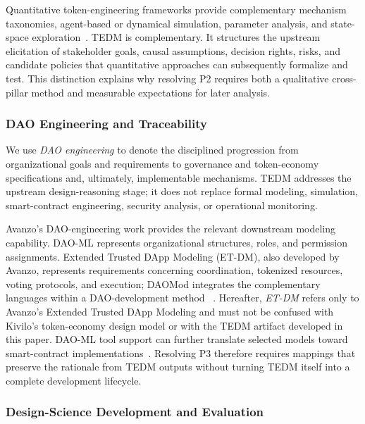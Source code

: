 \documentclass[referee,sn-basic]{sn-jnl}
\begin{document}
Quantitative token-engineering frameworks provide complementary mechanism taxonomies,
agent-based or dynamical simulation, parameter analysis, and state-space
exploration~\cite{liang2023cadcad,Sadykhov2025DeTEcT,
RiceZargham2019TokenEngineeringIII,Zargham2018StateSpaceBlockchain,
Zargham2020}. TEDM is complementary. It structures the upstream elicitation of
stakeholder goals, causal assumptions, decision rights, risks, and candidate
policies that quantitative approaches can subsequently formalize and test.
This distinction explains why resolving P2 requires both a qualitative
cross-pillar method and measurable expectations for later analysis.

\subsubsection{DAO Engineering and Traceability}\label{subsec:dao-engineering}

We use \emph{DAO engineering} to denote the disciplined progression from
organizational goals and requirements to governance and token-economy
specifications and, ultimately, implementable mechanisms. TEDM addresses the
upstream design-reasoning stage; it does not replace formal modeling,
simulation, smart-contract engineering, security analysis, or operational
monitoring.

Avanzo's DAO-engineering work provides the relevant downstream modeling
capability. DAO-ML represents organizational structures, roles, and permission
assignments. Extended Trusted DApp Modeling (ET-DM), also developed by Avanzo,
represents requirements concerning coordination, tokenized resources, voting
protocols, and execution; DAOMod integrates the complementary languages within
a DAO-development method
~\cite{Avanzo2024DAOML,Avanzo2025ExtendingTDM,Avanzo2026DAOMod}. Hereafter,
\emph{ET-DM} refers only to Avanzo's Extended Trusted DApp Modeling and must not
be confused with Kivilo's token-economy design model or with the TEDM artifact
developed in this paper. DAO-ML tool
support can further translate selected models toward smart-contract
implementations~\cite{Avanzo2025DAOMLToSolidity}. Resolving P3 therefore
requires mappings that preserve the rationale from TEDM outputs without
turning TEDM itself into a complete development lifecycle.

\subsubsection{Design-Science Development and Evaluation}\label{subsec:research-method}
\end{document}
